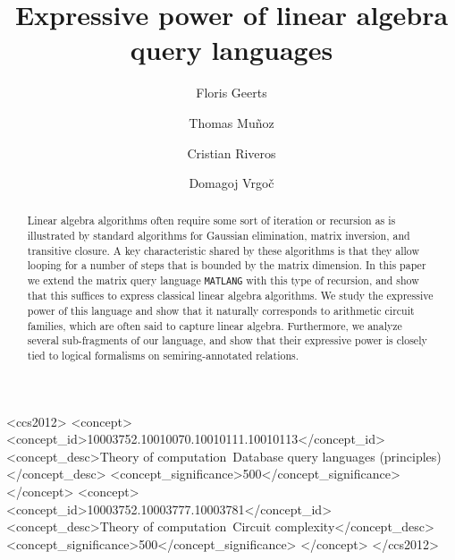 \documentclass[sigconf]{acmart}
\newcommand{\lang}{\texttt{MATLANG}\xspace}
\begin{document}
\title{Expressive power of linear algebra query languages}
\author{Floris Geerts}


\author{Thomas Mu{\~{n}}oz}

\author{Cristian Riveros}

\author{Domagoj Vrgo\v{c}}


\begin{abstract}
Linear algebra algorithms often require some sort of iteration or recursion as is illustrated by standard algorithms for Gaussian elimination, matrix inversion, and transitive closure. A key characteristic shared by these 
algorithms is that they allow looping for a number of steps that is bounded by the matrix dimension. 
In this paper we extend the matrix query language \lang with this type of recursion, and show that this suffices to express  classical linear algebra algorithms. We study the expressive power of this language and show that it naturally corresponds to arithmetic circuit families, which are often said to capture linear algebra. Furthermore, we analyze several sub-fragments of our language, and show that their expressive power is closely tied to logical formalisms on semiring-annotated relations.
\end{abstract}

\begin{CCSXML}
<ccs2012>
<concept>
<concept_id>10003752.10010070.10010111.10010113</concept_id>
<concept_desc>Theory of computation~Database query languages (principles)</concept_desc>
<concept_significance>500</concept_significance>
</concept>
<concept>
<concept_id>10003752.10003777.10003781</concept_id>
<concept_desc>Theory of computation~Circuit complexity</concept_desc>
<concept_significance>500</concept_significance>
</concept>
</ccs2012>
\end{CCSXML}
\end{document}
